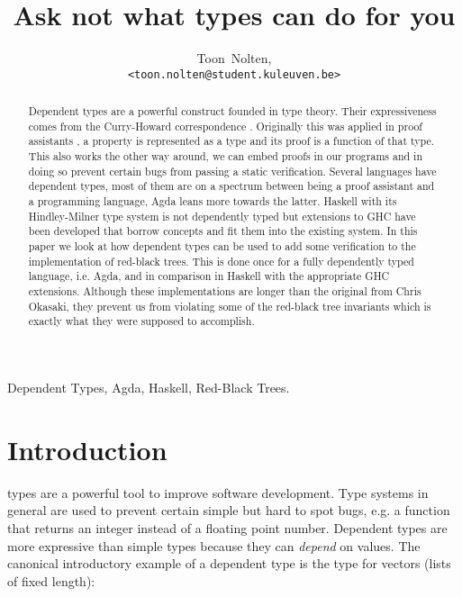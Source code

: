 \documentclass[journal, retainorgcmds]{IEEEtran}
\begin{document}
\title{Ask not what types can do for you}
\author{Toon~Nolten,\\ \texttt{<toon.nolten@student.kuleuven.be>}}%
\maketitle


\begin{abstract}
  Dependent types are a powerful construct founded in type theory.
  Their expressiveness comes from the Curry-Howard correspondence \cite{cuho}.
  Originally this was applied in proof assistants \cite{proofass}, a property
  is represented as a type and its proof is a function of that type.
  This also works the other way around, we can embed proofs in our programs and
  in doing so prevent certain bugs from passing a static verification.
  Several languages have dependent types, most of them are on a spectrum
  between being a proof assistant and a programming language, Agda leans more
  towards the latter.
  Haskell with its Hindley-Milner type system is not dependently typed but
  extensions to GHC have been developed that borrow concepts and fit them into
  the existing system.
  In this paper we look at how dependent types can be used to add some
  verification to the implementation of red-black trees.
  This is done once for a fully dependently typed language, i.e. Agda, and in
  comparison in Haskell with the appropriate GHC extensions.
  Although these implementations are longer than the original from Chris
  Okasaki, they prevent us from violating some of the red-black tree invariants
  which is exactly what they were supposed to accomplish.
\end{abstract}

\begin{IEEEkeywords}
  Dependent Types, Agda, Haskell, Red-Black Trees.
\end{IEEEkeywords}


\section{Introduction}
 types are a powerful tool to improve software
development.
Type systems in general are used to prevent certain simple but hard to spot
bugs, e.g. a function that returns an integer instead of a floating point
number.
Dependent types are more expressive than simple types because they can
\emph{depend} on values.
The canonical introductory example of a dependent type is the type for vectors
(lists of fixed length):
\end{document}
